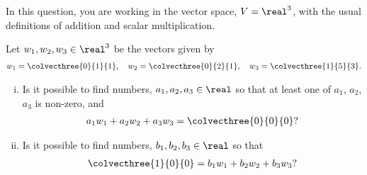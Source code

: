 \begin{question}
	\normalfont
	
	In this question, you are working in the vector space, $V=\real^3$, with the usual definitions of addition and scalar multiplication.  
	
	Let $w_1, w_2, w_3\in\real^3$ be the vectors given by 
    \[
        \begin{aligned}
            w_1 = \colvecthree{0}{1}{1},\ \ \ w_2=\colvecthree{0}{2}{1},\ \ \ 
            w_3 = \colvecthree{1}{5}{3}.
        \end{aligned}
    \]
	
	\begin{enumerate}[(i)]
		\item Is it possible to find numbers, $a_1,a_2,a_3\in\real$ so that at least one of $a_1$, $a_2$, $a_3$ is non-zero, and
        \[
            \begin{aligned}
                a_1 w_1 + a_2 w_2 + a_3 w_3 = \colvecthree{0}{0}{0}?
            \end{aligned}
        \]
		
		\item Is it possible to find numbers, $b_1,b_2,b_3\in\real$ so that 
		\[
            \begin{aligned}
                \colvecthree{1}{0}{0} = b_1 w_1 + b_2 w_2 + b_3 w_3?
            \end{aligned}
        \]
        
	\end{enumerate}
\end{question}

